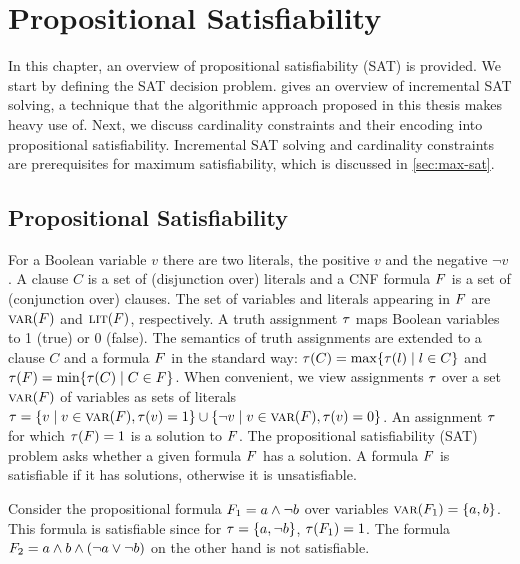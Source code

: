 \chapter{Propositional Satisfiability\label{chap:satisfiability}}

In this chapter, an overview of propositional satisfiability (SAT) is provided.
We start by defining the SAT decision problem.
 gives an overview of incremental SAT solving, a technique that the algorithmic approach proposed in this thesis makes heavy use of.
Next, we discuss cardinality constraints and their encoding into propositional satisfiability.
Incremental SAT solving and cardinality constraints are prerequisites for maximum satisfiability, which is discussed in \cref{sec:max-sat}.

\section{Propositional Satisfiability\label{sec:sat}}

For a Boolean variable $v$ there are two literals, the positive $v$ and the negative $\lnot v$. 
A clause $C$ is a set of (disjunction over) literals and a CNF formula $F$ is a set of (conjunction over) clauses.
The set of variables and literals appearing in $F$ are $\textsc{var}(F)$ and $\textsc{lit}(F)$, respectively.  
A truth assignment $\tau$ maps Boolean variables to 1 (true) or 0 (false).
The semantics of truth assignments are extended to a clause $C$ and a formula $F$ in the standard way: $\tau(C) = \max\{ \tau(l) \mid l \in C\}$ and $\tau(F) = \min\{\tau(C) \mid C \in F\}$.
When convenient, we view assignments $\tau$ over a set $\textsc{var}(F)$ of variables as sets of literals $\tau = \{ v \mid v \in \textsc{var}(F),  \tau(v) = 1\} \cup \{ \lnot v \mid v \in \textsc{var}(F), \tau(v) = 0\}$.
An assignment $\tau$ for which $\tau(F) = 1$ is a solution to $F$.
The propositional satisfiability (SAT) problem asks whether a given formula $F$ has a solution.
A formula $F$ is satisfiable if it has solutions, otherwise it is unsatisfiable.

\begin{example}
  Consider the propositional formula $F_1 = a \land \lnot b$ over variables $\textsc{var}(F_1) = \{a,b\}$.
  This formula is satisfiable since for $\tau=\{a,\lnot b\}$, $\tau(F_1)=1$.
  The formula $F_2 = a \land b \land (\lnot a \lor \lnot b)$ on the other hand is not satisfiable.
\end{example}

